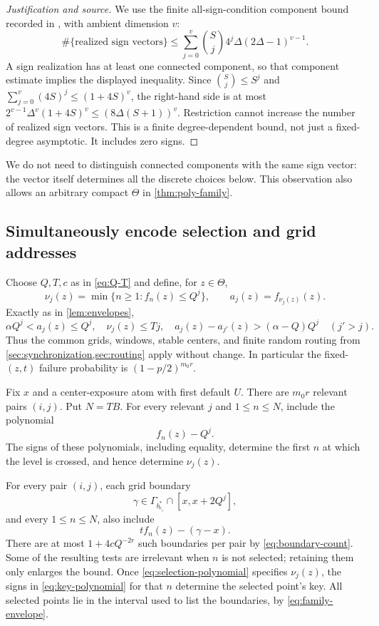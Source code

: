 \begin{proof}[Justification and source]
We use the finite all-sign-condition component bound recorded in
\cite[Section~3.2, equation~(3.3)]{BPR}, with ambient dimension $v$:
\[
 \#\{\text{realized sign vectors}\}
 \le \sum_{j=0}^v\binom Sj4^j\Delta(2\Delta-1)^{v-1}.
\]
A sign realization has at least one connected component, so that
component estimate implies the displayed inequality. Since
$\binom Sj\le S^j$ and
$\sum_{j=0}^v(4S)^j\le(1+4S)^v$, the right-hand side is at most
$2^{v-1}\Delta^v(1+4S)^v\le(8\Delta(S+1))^v$.
Restriction cannot increase the number of realized sign vectors.
This is a finite degree-dependent bound, not just a fixed-degree
asymptotic. It includes zero signs.
\end{proof}

We do not need to distinguish connected components with the same sign
vector: the vector itself determines all the discrete choices below.
This observation also allows an arbitrary compact $\Theta$ in
\cref{thm:poly-family}.

\subsection{Simultaneously encode selection and grid addresses}

Choose $Q,T,c$ as in \eqref{eq:Q-T} and define, for $z\in\Theta$,
\[
 \nu_j(z)=\min\{n\ge1:f_n(z)\le Q^j\},
 \qquad a_j(z)=f_{\nu_j(z)}(z).
\]
Exactly as in \cref{lem:envelopes},
\begin{equation}\label{eq:family-envelope}
 \alpha Q^j<a_j(z)\le Q^j,\quad \nu_j(z)\le Tj,
 \quad a_j(z)-a_{j'}(z)>(\alpha-Q)Q^j\quad(j'>j).
\end{equation}
Thus the common grids, windows, stable centers, and finite random
routing from \cref{sec:synchronization,sec:routing} apply without
change. In particular the fixed-$(z,t)$ failure probability is
$(1-p/2)^{m_0r}$.

Fix $x$ and a center-exposure atom with first default $U$.
There are $m_0r$ relevant pairs $(i,j)$. Put $N=TB$.
For every relevant $j$ and $1\le n\le N$, include the polynomial
\begin{equation}\label{eq:selection-polynomial}
 f_n(z)-Q^j.
\end{equation}
The signs of these polynomials, including equality, determine the
first $n$ at which the level is crossed, and hence determine
$\nu_j(z)$.

For every pair $(i,j)$, each grid boundary
\[
 \gamma\in\Gamma_{b_{e_i}^*}\cap[x,x+2Q^j],
\]
and every $1\le n\le N$, also include
\begin{equation}\label{eq:key-polynomial}
 t f_n(z)-(\gamma-x).
\end{equation}
There are at most $1+4cQ^{-2r}$ such boundaries per pair by
\eqref{eq:boundary-count}. Some of the resulting tests are irrelevant
when $n$ is not selected; retaining them only enlarges the bound.
Once \eqref{eq:selection-polynomial} specifies $\nu_j(z)$, the signs
in \eqref{eq:key-polynomial} for that $n$ determine the selected
point's key. All selected points lie in the interval used to list
the boundaries, by \eqref{eq:family-envelope}.

